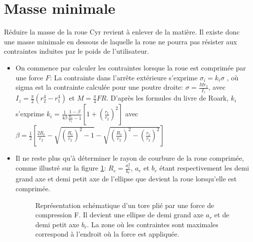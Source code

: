 \label{sec:Theme3}

\section{Masse minimale}

Réduire la masse de la roue Cyr revient à enlever de la matière. Il existe donc une masse minimale en dessous de laquelle la roue ne pourra pas résister aux contraintes induites par le poids de l'utilisateur.

\begin{itemize}
    \item On commence par calculer les contraintes lorsque la roue est comprimée par une force $F$: La contrainte dans l'arrête extérieure s'exprime $\sigma_i=k_i\sigma$ \cite{roark},
    où sigma est la contrainte calculée pour une poutre droite: $\sigma=\frac{Mr_2}{I_z}$, avec $I_z=\frac{\pi}{2}(r_2^4-r_1^4)$ et $M=\frac{\pi}{4}FR$.
    D'après les formules du livre de Roark, $k_i$ s'exprime $k_i=\frac{1}{4\beta}\frac{1-\beta}{\frac{R_c}{r_2}-1}[1+(\frac{r_1}{r_2})^2]$ avec $\beta=\frac{1}{2}[\frac{2R_c}{r_2}-\sqrt{(\frac{R_c}{r_2})^2-1}-\sqrt{(\frac{R_c}{r_2})^2-(\frac{r_1}{r_2})^2}]$ 
    \item Il ne reste plus qu'à déterminer le rayon de courbure de la roue comprimée, comme illustré sur la figure \ref{fig:ellr}: $R_c=\frac{a_r^2}{b_r}$, $a_r$ et $b_r$ étant respectivement les demi grand axe et demi petit axe de l'ellipse que devient la roue lorsqu'elle est comprimée.\\
    
    \begin{figure}[htb]
    \centering
    
    \caption{Représentation schématique d'un tore plié par une force de compression F. Il devient une ellipse de demi grand axe $a_r$ et de demi petit axe $b_r$. La zone où les contraintes sont maximales correspond à l'endroit où la force est appliquée.}
    \label{fig:ellr}
    \end{figure}
    

\end{itemize}
